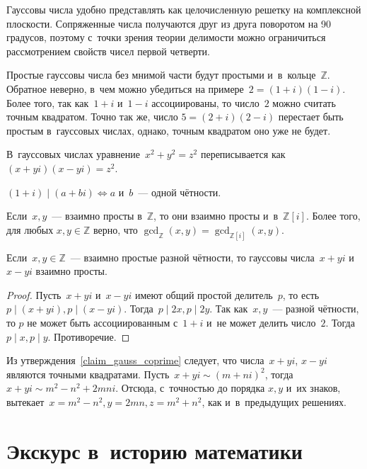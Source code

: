 \documentclass{article}
\begin{document}
Гауссовы числа удобно представлять как целочисленную решетку на комплексной
плоскости. Сопряженные числа получаются друг из друга поворотом на 90 градусов,
поэтому с~точки зрения теории делимости можно ограничиться рассмотрением
свойств чисел первой четверти.

Простые гауссовы числа без мнимой части будут простыми и~в~кольце~$\mathbb{Z}$.
Обратное неверно, в~чем можно убедиться на примере~$2 = (1 + i)(1 - i)$. Более
того, так как~$1 + i$ и~$1 - i$ ассоциированы, то число~$2$ можно считать
точным квадратом. Точно так же, число $5 = (2 + i)(2 - i)$ перестает быть
простым в~гауссовых числах, однако, точным квадратом оно уже не будет.


В~гауссовых числах уравнение~$x^2 + y^2 = z^2$ переписывается как
$(x + yi)(x - yi) = z^2$.

\begin{exercise}
  $(1 + i) \mid (a + bi) \Leftrightarrow a$ и~$b$~--- одной чётности.
\end{exercise}
\begin{exercise}
  Если~$x, y$~--- взаимно просты в~$\mathbb{Z}$, то они взаимно просты
  и~в~$\mathbb{Z}[i]$. Более того, для любых $x, y \in \mathbb{Z}$ верно,
  что $\gcd_{\mathbb{Z}}(x, y) = \gcd_{\mathbb{Z}[i]}(x, y)$.
\end{exercise}

\begin{claim}
  \label{claim_gauss_coprime}
  Если~$x, y \in \mathbb{Z}$~--- взаимно простые разной чётности, то гауссовы
  числа~$x + yi$ и~$x - yi$ взаимно просты.
\end{claim}
\begin{proof}
  Пусть~$x+yi$ и~$x-yi$ имеют общий простой делитель~$p$, то
  есть~$p \mid (x + yi), p \mid (x - yi)$. Тогда~$p \mid 2x, p \mid 2y$.
  Так как~$x, y$~--- разной чётности, то $p$ не может быть ассоциированным
  с~$1 + i$ и~не может делить число~$2$. Тогда~$p \mid x, p \mid y$.
  Противоречие.
\end{proof}

Из утверждения~\ref{claim_gauss_coprime} следует, что числа~$x + yi$, $x - yi$
являются точными квадратами. Пусть~$x + yi \sim (m + ni)^2$,
тогда~$x + yi \sim m^2 - n^2 + 2mni$. Отсюда, с~точностью до порядка $x, y$
и~их знаков, вытекает~$x = m^2 - n^2, y = 2mn, z = m^2 + n^2$, как
и~в~предыдущих решениях.


\section{Экскурс в~историю математики}
\end{document}
